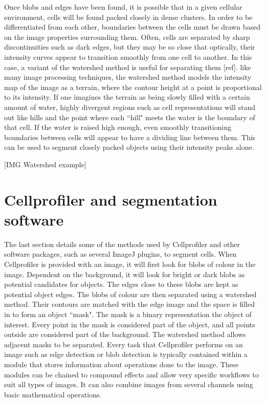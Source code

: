 Once blobs and edges have been found, it is possible that in a given cellular environment, cells will be found packed closely in dense clusters. In order to be differentiated from each other, boundaries between the cells must be drawn based on the image properties surrounding them. Often, cells are separated by sharp discontinuities such as dark edges, but they may be so close that optically, their intensity curves appear to transition smoothly from one cell to another. In this case, a variant of the watershed method is useful for separating them [ref]. like many image processing techniques, the watershed method models the intensity map of the image as a terrain, where the contour height at a point is proportional to its intensity. If one imagines the terrain as being slowly filled with a certain amount of water, highly divergent regions such as cell representations will stand out like hills and the point where each ``hill" meets the water is the boundary of that cell. If the water is raised high enough, even smoothly transitioning boundaries between cells will appear to have a dividing line between them. This can be used to segment closely packed objects using their intensity peaks alone.

[IMG Watershed example]

\section{Cellprofiler and segmentation software}

The last section details some of the methods used by Cellprofiler and other software packages, such as several ImageJ plugins, to segment cells. When Cellprofiler is provided with an image, it will first look for blobs of colour in the image. Dependent on the background, it will look for bright or dark blobs as potential candidates for objects. The edges close to these blobs are kept as potential object edges. The blobs of colour are then separated using a watershed method. Their contours are matched with the edge image and the space is filled in to form an object ``mask". The mask is a binary representation the object of interest. Every point in the mask is considered part of the object, and all points outside are considered part of the background. The watershed method allows adjacent masks to be separated. Every task that Cellprofiler performs on an image such as edge detection or blob detection is typically contained within a module that stores information about operations done to the image. These modules can be chained to compound effects and allow very specific workflows to suit all types of images. It can also combine images from several channels using basic mathematical operations.

